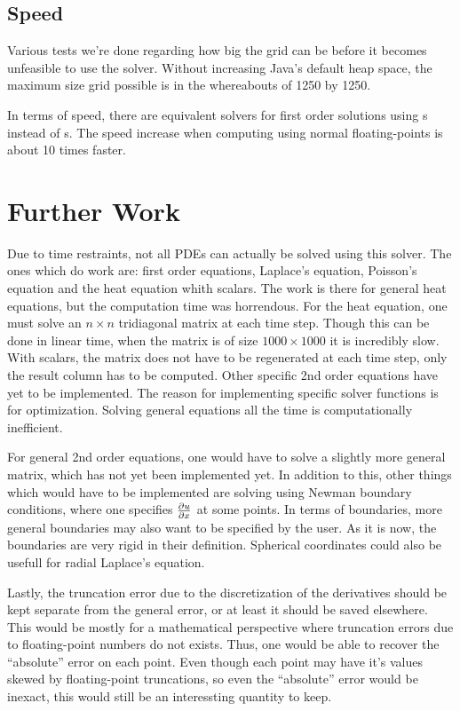 \subsection{Speed}
Various tests we're done regarding how big the grid can be before it
becomes unfeasible to use the solver. Without increasing Java's
default heap space, the maximum size grid possible is in the
whereabouts of 1250 by 1250.

In terms of speed, there are equivalent solvers for first order
solutions using s instead of s. The
speed increase when computing using normal floating-points is about 10
times faster.

\section{Further Work}
Due to time restraints, not all PDEs can actually be solved using this
solver. The ones which do work are: first order equations, Laplace's
equation, Poisson's equation and the heat equation whith scalars. The
work is there for general heat equations, but the computation time was
horrendous. For the heat equation, one must solve an $n\times n$
tridiagonal matrix at each time step. Though this can be done in
linear time, when the matrix is of size $1000\times1000$ it is
incredibly slow. With scalars, the matrix does not have to be
regenerated at each time step, only the result column has to be
computed. Other specific 2nd order equations have yet to be
implemented. The reason for implementing specific solver functions is
for optimization. Solving general equations all the time is
computationally inefficient.

For general 2nd order equations, one would have to solve a slightly more
general matrix, which has not yet been implemented yet. In addition to
this, other things which would have to be implemented are solving
using Newman boundary conditions, where one specifies $\frac{\partial u}{\partial x}$ at
some points. In terms of boundaries, more general boundaries may also
want to be specified by the user. As it is now, the boundaries are
very rigid in their definition.
Spherical coordinates could also be usefull for radial
Laplace's equation.

Lastly, the truncation error due to the discretization of the
derivatives should be kept separate from the general error, or at
least it should be saved elsewhere. This would be mostly for a
mathematical perspective where truncation errors due to floating-point
numbers do not exists. Thus, one would be able to recover the
``absolute'' error on each point. Even though each point may have it's
values skewed by floating-point truncations, so even the ``absolute''
error would be inexact, this would still be an interessting quantity
to keep.


